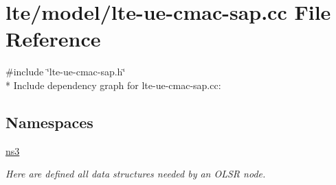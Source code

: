 \hypertarget{lte-ue-cmac-sap_8cc}{}\section{lte/model/lte-\/ue-\/cmac-\/sap.cc File Reference}
\label{lte-ue-cmac-sap_8cc}
{\ttfamily \#include \char`\"{}lte-\/ue-\/cmac-\/sap.\+h\char`\"{}}\\*
Include dependency graph for lte-\/ue-\/cmac-\/sap.cc\+:
\subsection*{Namespaces}
\begin{DoxyCompactItemize}
\item 
 \hyperlink{namespacens3}{ns3}
\begin{DoxyCompactList}\small\item\em Here are defined all data structures needed by an O\+L\+SR node. \end{DoxyCompactList}\end{DoxyCompactItemize}
